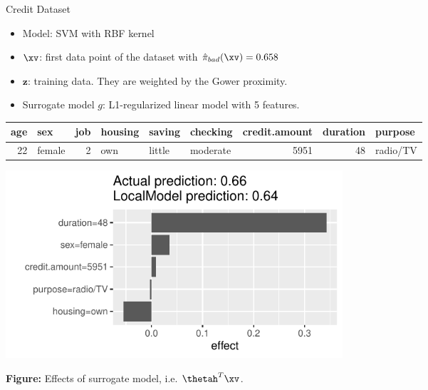 \documentclass[11pt,compress,t,notes=noshow, xcolor=table]{beamer}
\newcommand{\zv}{\mathbf{z}}
\newcommand{\pih}{\hat{\pi}}
\begin{document}
\begin{vbframe}{Credit Dataset}
	\begin{itemize}
		\item Model: SVM with RBF kernel
		\item $\xv$: first data point of the dataset with $\pih_{bad}(\xv) = 0.658$
		\item $\zv$: training data. They are weighted by the Gower proximity. 
		\item Surrogate model $g$: L1-regularized linear model with 5 features. 
	\end{itemize}
\vspace{-0.5cm}
	\begin{table}[ht]
		\centering
		\scriptsize
		\begin{tabular}{rlrlllrrl}
			\hline
			age & sex & job & housing & saving & checking & credit.amount & duration & purpose \\ 
			\hline
			 22 & female &   2 & own & little & moderate & 5951 &  48 & radio/TV \\ 
			\hline
		\end{tabular}
	\end{table}
\vspace{-0.5cm}
\begin{center}
	\includegraphics[width=0.55\textwidth]{figure/lime_credit.pdf}
	
	\tiny{\textbf{Figure:} Effects of surrogate model, i.e. $\thetah^T \xv$.}
	
\end{center}


\end{vbframe}
\end{document}
